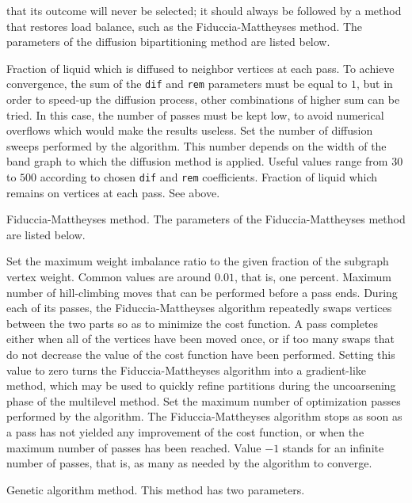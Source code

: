 \begin{itemize}
that its outcome will never be selected; it should always be followed
by a method that restores load balance, such as the
Fiduccia-Mattheyses method.
The parameters of the diffusion bipartitioning method are listed below.
\begin{itemize}
\iteme[{\tt dif=}{\it rat}]
Fraction of liquid which is diffused to neighbor vertices at each
pass. To achieve convergence, the sum of the {\tt dif} and {\tt rem}
parameters must be equal to $1$, but in order to speed-up the diffusion
process, other combinations of higher sum can be tried. In this case,
the number of passes must be kept low, to avoid numerical overflows
which would make the results useless.
\iteme[{\tt pass=}{\it nbr}]
Set the number of diffusion sweeps performed by the algorithm. This
number depends on the width of the band graph to which the diffusion
method is applied. Useful values range from $30$ to $500$ according
to chosen {\tt dif} and {\tt rem} coefficients.
\iteme[{\tt rem=}{\it rat}]
Fraction of liquid which remains on vertices at each pass. See above.
\end{itemize}
\iteme[{\tt f}]
Fiduccia-Mattheyses method. The parameters of the Fiduccia-Mattheyses method
are listed below.
\begin{itemize}
\iteme[{\tt bal=}{\it rat}]
Set the maximum weight imbalance ratio to the given fraction of
the subgraph vertex weight. Common values are around $0.01$, that
is, one percent.
\iteme[{\tt move=}{\it nbr}]
Maximum number of hill-climbing moves that can be performed before a
pass ends. During each of its passes, the Fiduccia-Mattheyses
algorithm repeatedly swaps vertices between the two parts so as to
minimize the cost function. A pass completes either when all of the
vertices have been moved once, or if too many swaps that do not
decrease the value of the cost function have been performed. Setting
this value to zero turns the Fiduccia-Mattheyses algorithm into a
gradient-like method, which may be used to quickly refine partitions
during the uncoarsening phase of the multilevel method.
\iteme[{\tt pass=}{\it nbr}]
Set the maximum number of optimization passes performed by the
algorithm. The Fiduccia-Mattheyses algorithm stops as soon as a pass
has not yielded any improvement of the cost function, or when the
maximum number of passes has been reached. Value $-1$ stands for an
infinite number of passes, that is, as many as needed by the algorithm
to converge.
\end{itemize}
\iteme[{\tt a}]
Genetic algorithm method. This method has two parameters.
\begin{itemize}

\end{itemize}
\end{itemize}
